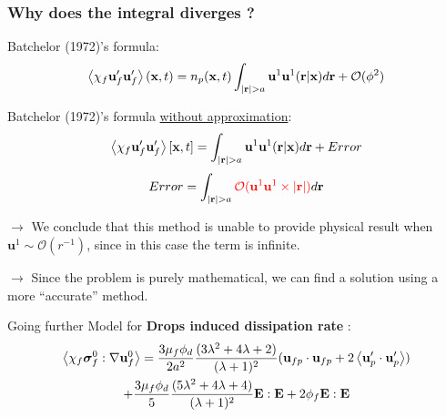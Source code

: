 \documentclass{sintefbeamer}
\begin{document}
\begin{frame}
  \frametitle{Why does the integral diverges ?}

  Batchelor (1972)'s  formula:
  \begin{equation*}
    \left<\chi_f \textbf{u}'_f\textbf{u}'_f\right>(\textbf{x},t)
    = 
    n_p(\textbf{x},t)
    \int_{|\textbf{r}| > a }
     \textbf{u}^1\textbf{u}^1(\textbf{r}|\textbf{x}) d\textbf{r}
    +\mathcal{O}(\phi^2)
\end{equation*}

  Batchelor (1972)'s  formula \underline{without approximation}: 
  \begin{equation}
    \left<\chi_f \textbf{u}_f' \textbf{u}_f'\right>[\textbf{x},t] =
    \int_{|\textbf{r}| > a } \textbf{u}^1\textbf{u}^1(\textbf{r}|\textbf{x}) d\textbf{r}
    + Error
  \end{equation}
  \begin{equation}
    Error = \int_{|\textbf{r}| > a }    
    \textcolor{red}{
    \mathcal{O}(\textbf{u}^1
    \textbf{u}^1 \times |\textbf{r}|)}
    d\textbf{r}
  \end{equation}


$\to$ We conclude that this method is unable to provide physical result when $\textbf{u}^1 \sim \mathcal{O}(r^{-1})$, since in this case the  term is infinite. 

$\to$ Since the problem is purely mathematical, we can find a solution using a more ``accurate'' method.

\end{frame}

\begin{frame}
  {Going further}
   Model for \textbf{Drops induced dissipation rate} : 
   \begin{multline*}
    \left<\chi_f \bm\sigma_f^0 :\mathbf{\nabla}\textbf{u}_f^0\right>
    =
    \frac{3\mu_f \phi_d}{2a^2}
    \frac{(3\lambda^2 + 4\lambda +2)}{(\lambda + 1)^2}
    (\textbf{u}_{fp}\cdot \textbf{u}_{fp} + 2 \left<\textbf{u}_p'\cdot\textbf{u}_p'\right>) \\
    + 
    \frac{3\mu_f \phi_d}{5}
    \frac{(5\lambda^2 + 4\lambda +4)}{(\lambda + 1)^2}
    \textbf{E}:\textbf{E}
    +2 \phi_f \textbf{E}:\textbf{E}
\end{multline*}
\end{frame}
\end{document}
